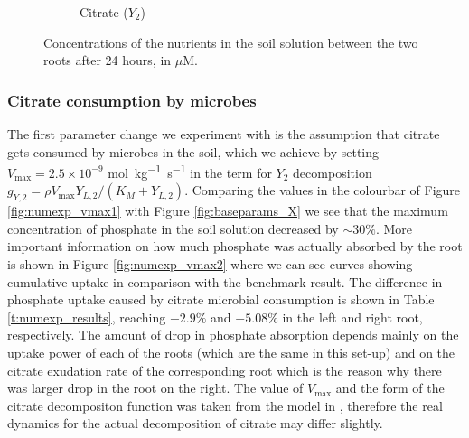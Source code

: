 \documentclass[11pt]{article}
\numberwithin{equation}{section}
\begin{document}
\begin{figure}[!htb]
\begin{subfigure}[t]{0.32\textwidth}
    \caption{Citrate ($Y_2$)}
    \label{fig:baseparams_Y2}
\end{subfigure}
\caption{Concentrations of the nutrients in the soil solution between the two roots after 24 hours, in $\mu$M.}
\label{fig:baseparams}
\end{figure}

\subsubsection{Citrate consumption by microbes}
\label{sec:numexp_vmax}
The first parameter change we experiment with is the assumption that citrate gets consumed by microbes in the soil, which we achieve by setting $V_{\max} = 2.5 \times 10^{-9}$ \si{mol.kg^{-1}.s^{-1}} in the term for $Y_2$ decomposition $g_{Y,2} = \rho V_{\max} Y_{L,2}/(K_M+Y_{L,2})$. Comparing the values in the colourbar of Figure \ref{fig:numexp_vmax1} with Figure \ref{fig:baseparams_X} we see that the maximum concentration of phosphate in the soil solution decreased by $\sim 30\%$. More important information on how much phosphate was actually absorbed by the root is shown in Figure \ref{fig:numexp_vmax2} where we can see curves showing cumulative uptake in comparison with the benchmark result. The difference in phosphate uptake caused by citrate microbial consumption is shown in Table \ref{t:numexp_results}, reaching $-2.9\%$ and $-5.08\%$ in the left and right root, respectively. The amount of drop in phosphate absorption depends mainly on the uptake power of each of the roots (which are the same in this set-up) and on the citrate exudation rate of the corresponding root which is the reason why there was larger drop in the root on the right. The value of $V_{\max}$ and the form of the citrate decompositon function was taken from the  model in \cite{Ptashnyk-2011}, therefore the real dynamics for the actual decomposition of citrate may differ slightly.
\end{document}

